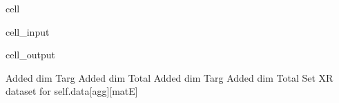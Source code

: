 \documentclass[letterpaper,table,10pt,english]{jupyterBook}
\begin{document}
\begin{sphinxuseclass}{cell}\begin{sphinxVerbatimInput}

\begin{sphinxuseclass}{cell_input}
\begin{sphinxVerbatim}[commandchars=\\\{\}]
         
\end{sphinxVerbatim}

\end{sphinxuseclass}\end{sphinxVerbatimInput}
\begin{sphinxVerbatimOutput}

\begin{sphinxuseclass}{cell_output}
\begin{sphinxVerbatim}[commandchars=\\\{\}]
Added dim Targ
Added dim Total
Added dim Targ
Added dim Total
Set XR dataset for self.data[\PYGZsq{}agg\PYGZsq{}][\PYGZsq{}matE\PYGZsq{}]
\end{sphinxVerbatim}

\end{sphinxuseclass}\end{sphinxVerbatimOutput}

\end{sphinxuseclass}
\end{document}
